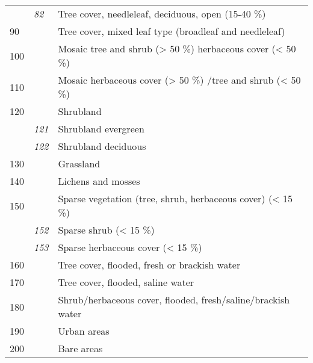 \begin{table}[htbp]
\begin{tabular}{lll}
    & \textit{82}          & Tree cover, needleleaf, deciduous, open (15-40 \%)                  \\
    90                       &                      & Tree cover, mixed leaf type (broadleaf and needleleaf)              \\
    100                      &                      & Mosaic tree and shrub (> 50 \%) herbaceous cover (< 50 \%)          \\
    110                      &                      & Mosaic herbaceous cover (> 50 \%) /tree and shrub (< 50 \%)         \\
    120                      &                      & Shrubland                                                           \\
    & \textit{121}         & Shrubland evergreen                                                 \\
    & \textit{122}         & Shrubland deciduous                                                 \\
    130                      &                      & Grassland                                                           \\
    140                      &                      & Lichens and mosses                                                  \\
    150                      &                      & Sparse vegetation (tree, shrub, herbaceous cover) (< 15 \%)         \\
    & \textit{152}         & Sparse shrub (< 15 \%)                                              \\
    & \textit{153}         & Sparse herbaceous cover (< 15 \%)                                   \\
    160                      &                      & Tree cover, flooded, fresh or brackish water                        \\
    170                      &                      & Tree cover, flooded, saline water                                   \\
    180                      &                      & Shrub/herbaceous cover, flooded, fresh/saline/brackish water        \\
    190                      &                      & Urban areas                                                         \\
    200                      &                      & Bare areas                                                          \\

\end{tabular}
\end{table}
